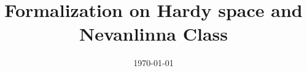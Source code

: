 \documentclass[11pt, a4paper, UKenglish]{scrreprt}
\date{\today}
\title{Formalization on Hardy space and Nevanlinna Class}
\theoremstyle{definition}
\newcommand{\1}{\mathbf{1}}
\begin{document}
\maketitle



\clearpage

\tableofcontents{}
\clearpage






\appendix




\end{document}
